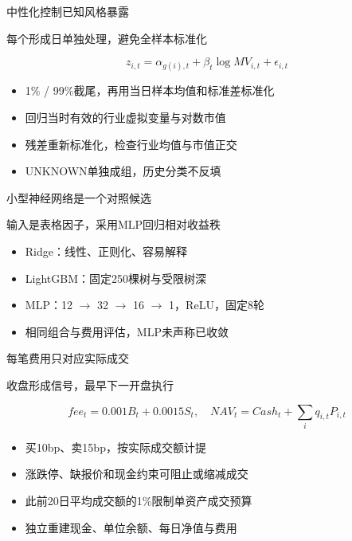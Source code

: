 \documentclass[aspectratio=169,10pt]{beamer}
\begin{document}
\begin{frame}{中性化控制已知风格暴露}
\begin{block}{}每个形成日单独处理，避免全样本标准化\end{block}
\[z_{i,t}=\alpha_{g(i),t}+\beta_t\log MV_{i,t}+\epsilon_{i,t}\]
\small\begin{itemize}
\item 1\% / 99\%截尾，再用当日样本均值和标准差标准化
\item 回归当时有效的行业虚拟变量与对数市值
\item 残差重新标准化，检查行业均值与市值正交
\item UNKNOWN单独成组，历史分类不反填
\end{itemize}
\end{frame}

\begin{frame}{小型神经网络是一个对照候选}
\begin{block}{}输入是表格因子，采用MLP回归相对收益秩\end{block}
\small\begin{itemize}
\item Ridge：线性、正则化、容易解释
\item LightGBM：固定250棵树与受限树深
\item MLP：12 $\to$ 32 $\to$ 16 $\to$ 1，ReLU，固定8轮
\item 相同组合与费用评估，MLP未声称已收敛
\end{itemize}
\end{frame}

\begin{frame}{每笔费用只对应实际成交}
\begin{block}{}收盘形成信号，最早下一开盘执行\end{block}
\[fee_t=0.001B_t+0.0015S_t,\quad NAV_t=Cash_t+\sum_i q_{i,t}P_{i,t}\]
\small\begin{itemize}
\item 买10bp、卖15bp，按实际成交额计提
\item 涨跌停、缺报价和现金约束可阻止或缩减成交
\item 此前20日平均成交额的1\%限制单资产成交预算
\item 独立重建现金、单位余额、每日净值与费用
\end{itemize}
\end{frame}
\end{document}
